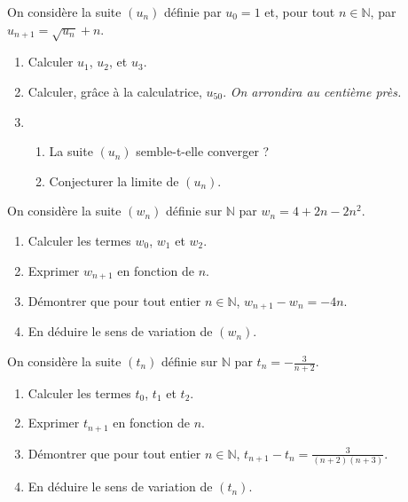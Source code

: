 \documentclass[11pt]{article}
\begin{document}
\begin{exo}[$2$ points]
  On considère la suite $(u_n)$ définie par $u_0=1$ et, pour tout
  $n\in\mathbb{N}$, par $u_{n+1}=\sqrt{u_n}+n$.
  \begin{enumerate}
    \item Calculer $u_1$, $u_2$, et $u_3$.
    \item Calculer, gr\^ace à la calculatrice, $u_{50}$. \emph{On arrondira au
      centième près.}
    \item \begin{enumerate}
        \item La suite $(u_n)$ semble-t-elle converger ?
        \item Conjecturer la limite de $(u_n)$.
      \end{enumerate}
  \end{enumerate}
\end{exo}

\begin{exo}[$3$ points]
  On considère la suite $(w_n)$ définie sur $\mathbb{N}$ par $w_n=4+2n-2n^2$.
  \begin{enumerate}
    \item Calculer les termes $w_0$, $w_1$ et $w_2$.
    \item Exprimer $w_{n+1}$ en fonction de $n$.
    \item Démontrer que pour tout entier $n\in\mathbb{N}$, $w_{n+1}-w_n=-4n$.
    \item En déduire le sens de variation de $(w_n)$.
  \end{enumerate}
\end{exo}

\begin{exo}[$3$ points]
  On considère la suite $(t_n)$ définie sur $\mathbb{N}$ par
  $t_n=-\frac{3}{n+2}$.
  \begin{enumerate}
    \item Calculer les termes $t_0$, $t_1$ et $t_2$.
    \item Exprimer $t_{n+1}$ en fonction de $n$.
    \item Démontrer que pour tout entier $n\in\mathbb{N}$,
      $t_{n+1}-t_n=\frac{3}{(n+2)(n+3)}$.
    \item En déduire le sens de variation de $(t_n)$.
  \end{enumerate}
\end{exo}
\end{document}

